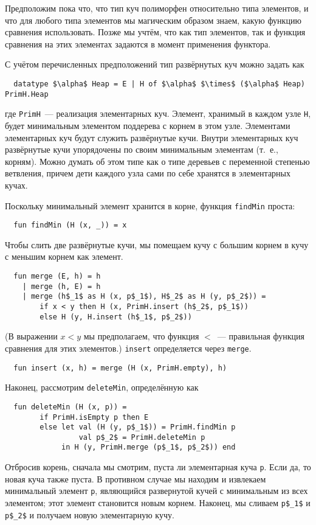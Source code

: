 Предположим пока что, что тип куч полиморфен относительно типа
элементов, и что для любого типа элементов мы магическим образом
знаем, какую функцию сравнения использовать. Позже мы учтём, что как
тип элементов, так и функция сравнения на этих элементах задаются в
момент применения функтора.

С учётом перечисленных предположений тип развёрнутых куч можно задать
как
\begin{lstlisting}
  datatype $\alpha$ Heap = E | H of $\alpha$ $\times$ ($\alpha$ Heap) PrimH.Heap
\end{lstlisting}
где \lstinline!PrimH!~--- реализация элементарных куч. Элемент,
хранимый в каждом узле \lstinline!H!, будет минимальным элементом
поддерева с корнем в этом узле. Элементами элементарных куч будут
служить развёрнутые кучи. Внутри элементарных куч развёрнутые кучи
упорядочены по своим минимальным элементам (т.~е., корням). Можно
думать об этом типе как о типе деревьев с переменной степенью
ветвления, причем дети каждого узла сами по себе хранятся в
элементарных кучах.

Поскольку минимальный элемент хранится в корне, функция
\lstinline!findMin! проста:
\begin{lstlisting}
  fun findMin (H (x, _)) = x
\end{lstlisting}
Чтобы слить две развёрнутые кучи, мы помещаем кучу с большим корнем в
кучу с меньшим корнем как элемент.
\begin{lstlisting}
  fun merge (E, h) = h
    | merge (h, E) = h
    | merge (h$_1$ as H (x, p$_1$), H$_2$ as H (y, p$_2$)) =
        if x < y then H (x, PrimH.insert (h$_2$, p$_1$))
        else H (y, H.insert (h$_1$, p$_2$))
\end{lstlisting}
(В выражении $x < y$ мы предполагаем, что функция $<$~--- правильная
функция сравнения для этих элементов.) \lstinline!insert!
определяется через \lstinline!merge!.
\begin{lstlisting}
  fun insert (x, h) = merge (H (x, PrimH.empty), h)
\end{lstlisting}
Наконец, рассмотрим \lstinline!deleteMin!, определённую как
\begin{lstlisting}
  fun deleteMin (H (x, p)) =
        if PrimH.isEmpty p then E
        else let val (H (y, p$_1$)) = PrimH.findMin p
                 val p$_2$ = PrimH.deleteMin p
             in H (y, PrimH.merge (p$_1$, p$_2$)) end
\end{lstlisting}
Отбросив корень, сначала мы смотрим, пуста ли элементарная куча
\lstinline!p!. Если да, то новая куча также пуста. В противном случае
мы находим и извлекаем минимальный элемент \lstinline!p!, являющийся
развернутой кучей с минимальным из всех элементом; этот элемент
становится новым корнем. Наконец, мы сливаем \lstinline!p$_1$! и
\lstinline!p$_2$! и получаем новую элементарную кучу.

